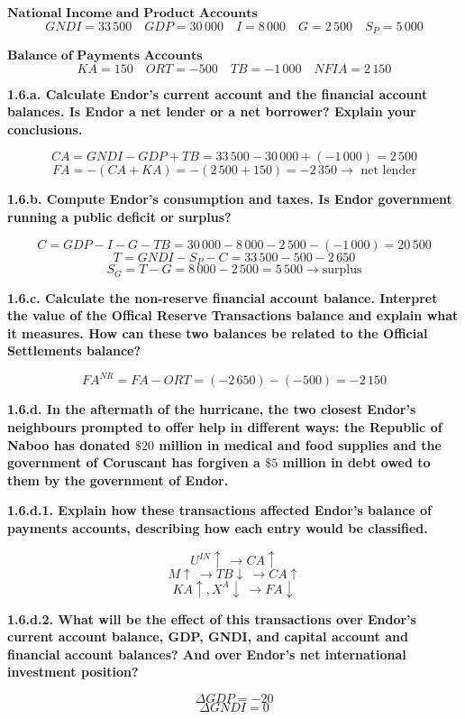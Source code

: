 \documentclass[11pt, a4paper]{article}
\begin{document}
$ \textbf{National Income and Product Accounts} $
$$ GNDI = 33\,500 \quad GDP = 30\,000 \quad I = 8\,000 \quad G = 2\,500 \quad S_P = 5\,000  $$

$ \textbf{Balance of Payments Accounts } $
$$KA = 150 \quad ORT = -500 \quad TB = -1\,000 \quad NFIA = 2\,150 $$

\textbf{1.6.a. Calculate Endor’s current account and the financial account balances. Is Endor a net lender or a net borrower? Explain your conclusions.}


$$CA =  GNDI - GDP + TB = 33\,500  - 30\,000 + (-1\,000) = 2\,500$$
$$FA =  -(CA + KA) = -(2\,500+150) = -2\,350 \rightarrow \text{ net lender}$$


\textbf{1.6.b. Compute Endor’s consumption and taxes. Is Endor government running a public
deficit or surplus?}

$$C =  GDP - I - G - TB = 30\,000 - 8\,000 - 2\,500 - (-1\,000) = 20\,500$$
$$T =  GNDI - S_P - C = 33\,500 - 500 - 2\,650$$
$$S_G = T - G = 8\,000-2\,500 = 5\,500 \rightarrow \text{surplus}$$

\newpage
\textbf{1.6.c. Calculate the non-reserve financial account balance. Interpret the value of the Offical Reserve Transactions balance and explain what it measures. How can these two balances be related to the Official Settlements balance? }

$$ FA^{NR} = FA - ORT = (-2\,650) - (-500) = -2\,150 $$

\textbf{1.6.d. In the aftermath of the hurricane, the two closest Endor’s neighbours prompted to offer help in different ways: the Republic of Naboo has donated $\$20$ million in medical and food supplies and the government of Coruscant has forgiven a $\$5$ million in debt owed to them by the government of Endor.}

\textbf{1.6.d.1. Explain how these transactions affected Endor’s balance of payments accounts, describing
how each entry would be classified.}


$$U^{IN} \uparrow \ \rightarrow CA \uparrow$$
$$M \uparrow \ \rightarrow TB \downarrow \ \rightarrow CA  \uparrow$$
$$KA \uparrow, X^A \downarrow \ \rightarrow FA \downarrow$$


\textbf{1.6.d.2. What will be the effect of this transactions over Endor’s current account balance, GDP, GNDI, and capital account and financial account balances? And over Endor’s net international investment position? }

$$ \Delta GDP = -20$$
$$ \Delta GNDI = 0$$
\end{document}

